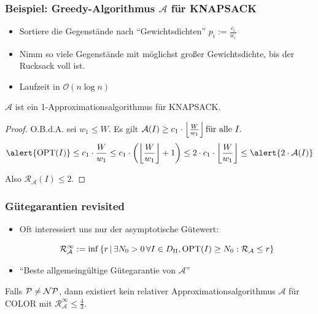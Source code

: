 \begin{frame}
	\frametitle{Beispiel: Greedy-Algorithmus $\mathcal{A}$ für KNAPSACK}
	
	\begin{itemize}
		\item Sortiere die Gegenstände nach "`Gewichtsdichten"' $p_i := \frac{c_i}{w_i}$
		\item Nimm so viele Gegenstände mit möglichst großer Gewichtsdichte, bis der Rucksack voll ist.
		\item Laufzeit in $\mathcal{O}(n \log{n})$
	\end{itemize}
	
	\pause
	
	\begin{theorem}
		$\mathcal{A}$ ist ein 1-Approximationsalgorithmus für KNAPSACK.
	\end{theorem}
	
	\pause
	
	\begin{proof}
		O.B.d.A. sei $w_1 \leq W$. Es gilt $\mathcal{A}(I) \geq c_1 \cdot \left\lfloor \frac{W}{w_1} \right\rfloor \text{für alle }I.$ \pause 
		$$\alert{\opt{I}} \leq c_1 \cdot \frac{W}{w_1} \leq c_1 \cdot \left(  \left\lfloor \frac{W}{w_1} \right\rfloor + 1 \right) \leq 2 \cdot c_1 \cdot \left\lfloor \frac{W}{w_1} \right\rfloor \leq \alert{2 \cdot \A{I}}$$
		
		Also $\mathcal{R}_\mathcal{A}(I) \leq 2$.
	\end{proof}
\end{frame}

\begin{frame}
	\frametitle{Gütegarantien revisited}
	
	\begin{itemize}
		\item Oft interessiert uns nur der asymptotische Gütewert:
	
	$$\mathcal{R}_\mathcal{A}^\infty := \inf\left\lbrace r \,\middle\vert\, \exists N_0 > 0\, \forall I \in D_\Pi, \text{OPT}(I) \geq N_0: \mathcal{R}_\mathcal{A} \leq r \right\rbrace$$
	
		\item ``Beste allgemeingültige Gütegarantie von $\mathcal{A}$''
	\end{itemize}
	
	\pause
	
	\begin{theorem}
		Falls $\mathcal{P}{} \neq \mathcal{NP}{}$, dann existiert kein relativer Approximationsalgorithmus $\mathcal{A}$ für COLOR mit $\mathcal{R}_\mathcal{A}^\infty \leq \frac{4}{3}$.
	\end{theorem}
\end{frame}

